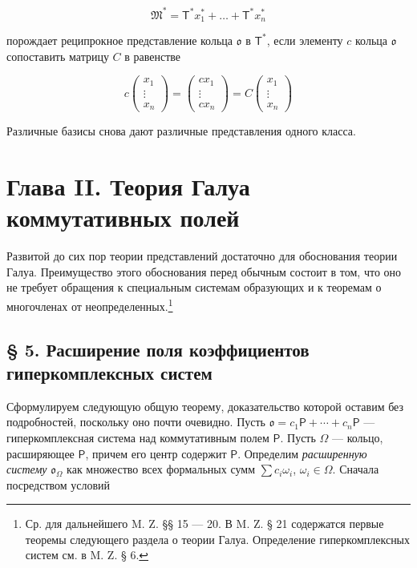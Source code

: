 \documentclass[11pt]{article}
\newcommand{\srcfn}[2]{\footnote{#2}}
\begin{document}
\[\mathfrak{M}^* = \mathsf{T}^* x_1^* + \dots + \mathsf{T}^* x_n^*\]

порождает реципрокное представление кольца \(\mathfrak{o}\) в \(\mathsf T^*\), если элементу \(c\) кольца \(\mathfrak{o}\) сопоставить матрицу \(C\) в равенстве

\[
c\begin{pmatrix}x_1\\ \vdots\\ x_n\end{pmatrix}
=\begin{pmatrix}cx_1\\ \vdots\\ cx_n\end{pmatrix}
=C\begin{pmatrix}x_1\\ \vdots\\ x_n\end{pmatrix}
\]

Различные базисы снова дают различные представления одного класса.

\section*{Глава II. Теория Галуа коммутативных полей}\label{kapitel-ii.-galoissche-theorie-kommutativer-koerper}

Развитой до сих пор теории представлений достаточно для обоснования теории Галуа. Преимущество этого обоснования перед обычным состоит в том, что оно не требует обращения к специальным системам образующих и к теоремам о многочленах от неопределенных.\srcfn{1}{Ср. для дальнейшего M. Z. §§ 15 --- 20. В M. Z. § 21 содержатся первые теоремы следующего раздела о теории Галуа. Определение гиперкомплексных систем см. в M. Z. § 6.}

\subsection*{§ 5. Расширение поля коэффициентов гиперкомплексных систем}\label{koeffizientenerweiterung-hyperkomplexer-systeme}

Сформулируем следующую общую теорему, доказательство которой оставим без подробностей, поскольку оно почти очевидно. Пусть \(\mathfrak{o}=c_1\mathsf P+\cdots+c_n\mathsf P\) --- гиперкомплексная система над коммутативным полем \(\mathsf P\). Пусть \(\Omega\) --- кольцо, расширяющее \(\mathsf P\), причем его центр содержит \(\mathsf P\). Определим \emph{расширенную систему} \(\mathfrak{o}_{\Omega}\) как множество всех формальных сумм \(\sum c_i\omega_i\), \(\omega_i\in\Omega\). Сначала посредством условий
\end{document}

